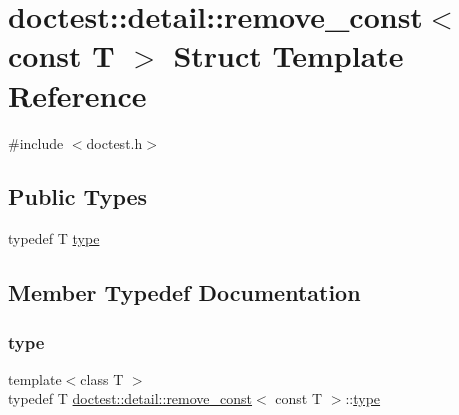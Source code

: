 \hypertarget{structdoctest_1_1detail_1_1remove__const_3_01const_01_t_01_4}{}\section{doctest\+:\+:detail\+:\+:remove\+\_\+const$<$ const T $>$ Struct Template Reference}
\label{structdoctest_1_1detail_1_1remove__const_3_01const_01_t_01_4}


{\ttfamily \#include $<$doctest.\+h$>$}

\subsection*{Public Types}
\begin{DoxyCompactItemize}
\item 
typedef T \hyperlink{structdoctest_1_1detail_1_1remove__const_3_01const_01_t_01_4_ab1e642665bafaad4023fba5295290b17}{type}
\end{DoxyCompactItemize}


\subsection{Member Typedef Documentation}
\mbox{\label{structdoctest_1_1detail_1_1remove__const_3_01const_01_t_01_4_ab1e642665bafaad4023fba5295290b17}} 
\subsubsection{\texorpdfstring{type}{type}}
{\footnotesize\ttfamily template$<$class T $>$ \\
typedef T \hyperlink{structdoctest_1_1detail_1_1remove__const}{doctest\+::detail\+::remove\+\_\+const}$<$ const T $>$\+::\hyperlink{structdoctest_1_1detail_1_1remove__const_3_01const_01_t_01_4_ab1e642665bafaad4023fba5295290b17}{type}}

